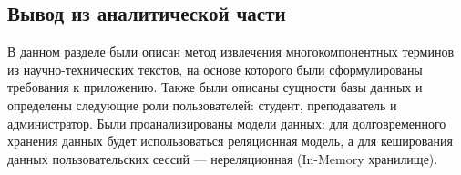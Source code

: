 \subsection*{Вывод из аналитической части}

В данном разделе были описан метод извлечения многокомпонентных терминов из научно-технических текстов, на основе которого были сформулированы требования к приложению. Также были описаны сущности базы данных и определены следующие роли пользователей: студент, преподаватель и администратор. Были проанализированы модели данных: для долговременного хранения данных будет использоваться реляционная модель, а для кеширования данных пользовательских сессий --- нереляционная (In-Memory хранилище).



\pagebreak